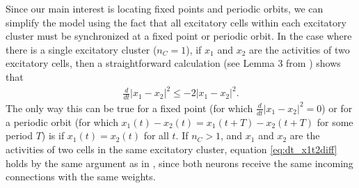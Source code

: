 \documentclass[reqno]{siamonline190516}
\begin{document}
Since our main interest is locating fixed points and periodic orbits, we can simplify the model using the fact that all excitatory cells within each excitatory cluster must be synchronized at a fixed point or periodic orbit. In the case where there is a single excitatory cluster ($n_C = 1$), if $x_1$ and $x_2$ are the activities of two excitatory cells, then a straightforward calculation (see Lemma 3 from \cite{Barreiro2017}) shows that
\begin{align}\label{eq:dt_x1t2diff}
\frac{d}{dt}|x_1 - x_2|^2 \leq -2 |x_1 - x_2 |^2.
\end{align}
The only way this can be true for a fixed point (for which $\frac{d}{dt} |x_1 - x_2|^2 =0$) or for a periodic orbit (for which $x_1(t)-x_2(t) = x_1(t+T)-x_2(t+T)$ for some period $T$) is if $x_1(t) = x_2(t)$ for all $t$. If $n_C > 1$, and $x_1$ and $x_2$ are the activities of two cells in the same excitatory cluster, equation \cref{eq:dt_x1t2diff} holds by the same argument as in \cite{Barreiro2017}, since both neurons receive the same incoming connections with the same weights. 
\end{document}
